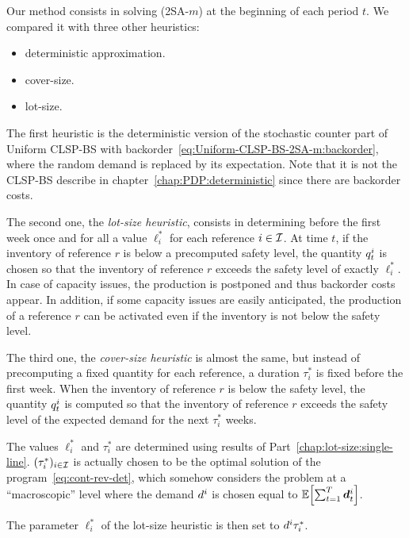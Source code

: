 Our method consists in solving (2SA-$m$) at the beginning of each period $t$. We compared it with three other heuristics:
\begin{itemize}
  \item deterministic approximation.
  \item cover-size.
  \item lot-size.
\end{itemize}


The first heuristic is the deterministic version of the stochastic counter part of Uniform CLSP-BS with backorder~\eqref{eq:Uniform-CLSP-BS-2SA-m:backorder}, where the random demand is replaced by its expectation. Note that it is not the CLSP-BS describe in chapter~\ref{chap:PDP:deterministic} since there are backorder costs.


The second one, the {\em lot-size heuristic}, consists in determining before the first week once and for all a value $\ell_i^*$ for each reference $i\in\mathcal{I}$.
At time $t$, if the inventory of reference $r$ is below a precomputed safety level, the quantity $q_t^i$ is chosen so that the inventory of reference $r$ exceeds the safety level of exactly $\ell_i^*$.
In case of capacity issues, the production is postponed and thus backorder costs appear. In addition, if some capacity issues are easily anticipated, the production of a reference $r$ can be activated even if the inventory is not below the safety level.


The third one, the {\em cover-size heuristic} is almost the same, but instead of precomputing a fixed quantity for each reference, a duration $\tau_i^*$ is fixed before the first week. When the inventory of reference $r$ is below the safety level, the quantity $q_t^i$ is computed so that the inventory of reference $r$ exceeds the safety level of the expected demand for the next $\tau_i^*$ weeks.


The values $\ell_i^*$ and $\tau_i^*$ are determined using results of Part~\ref{chap:lot-size:single-line}. $(\tau_i^*)_{i\in\mathcal{I}}$ is actually chosen to be the optimal solution of the program~\eqref{eq:cont-rev-det}, which somehow considers the problem at a ``macroscopic'' level
where the demand $d^i$ is chosen equal to $\espe\sqbracket{\sum_{t=1}^{\horizon}\va d_t^i}$.

The parameter $\ell_i^*$ of the lot-size heuristic is then set to $d^i\tau_i^*$.

